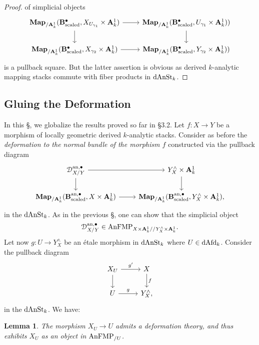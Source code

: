 \documentclass[10pt,a4paper,reqno]{amsart} %
\theoremstyle{plain}
\newtheorem{lem}[thm]{Lemma}
\theoremstyle{definition}
\theoremstyle{remark}
\numberwithin{equation}{section}
\begin{document}
\begin{proof}
    of simplicial objects
        \[
        \begin{tikzcd}
            \bfMap_{/ \bA^1_k}(\mathbf B_\mathrm{scaled}^\bullet,  X_{U_{\gamma_1}} \times \bA^1_k) \ar{r} \ar{d} & \bfMap_{/ \bA^1_k}(\mathbf B_\mathrm{scaled}^\bullet, U_{\gamma_1} \times \bA^1_k) )  \ar{d} \\
            \bfMap_{/ \bA^1_k}(\mathbf B_\mathrm{scaled}^\bullet, X_{{\gamma_2}} \times \bA^1_k) \ar{r} & \bfMap_{/ \bA^1_k}(\mathbf B_\mathrm{scaled}^\bullet, Y_{\gamma_2} \times \bA^1_k) )
        \end{tikzcd}
        \]
    is a pullback square. But the latter assertion is obvious as derived $k$-analytic mapping stacks commute with fiber products in $\mathrm{dAnSt}_k$.
\end{proof}





\subsection{Gluing the Deformation} In this \S, we globalize the results proved so far in \S 3.2.
Let $f \colon X \to Y$ be a morphism of locally geometric derived $k$-analytic stacks.
Consider as before the \emph{deformation to the normal bundle of the morphism $f$} constructed via the pullback diagram
    \[
    \begin{tikzcd}
        \cD^{\mathrm{an}, \bullet}_{X/ Y} \ar{r} \ar{d} & Y^\wedge_X \times \bA^1_k \ar{d} \\
        \bfMap_{/ \bA^1_k} (\bB^{\mathrm{an}, \bullet}_\mathrm{scaled}, X \times \bA^1_k) \ar{r} & \bfMap_{/ \bA^1_k}(\bB^{\mathrm{an},\bullet}_{\mathrm{scaled}}, Y^\wedge_X \times \bA^1_k),
    \end{tikzcd}
    \]
in the \infcat $\mathrm{dAnSt}_k$. As in the previous \S, one can show that the simplicial object 
    \[
        \mathcal D^{\mathrm{an}, \bullet}_{X/ Y} \in \mathrm{AnFMP}_{X \times \mathbf A^1_k/ /Y^\wedge_X \times \mathbf A^1_k}.
    \]
Let now $g \colon U \to Y^\wedge_X$ be an \'etale morphism in $\mathrm{dAnSt}_k$ where $U \in \mathrm{dAfd}_k$. Consider the pullback diagram
    \[
    \begin{tikzcd}
        X_U \ar{r}{g'} \ar{d} & X \ar{d}{f} \\
        U \ar{r}{g} & Y^\wedge_X,
    \end{tikzcd}
    \]
in the \infcat $\mathrm{dAnSt}_k$. We have:

\begin{lem}
    The morphism $X_U \to U$ admits a deformation theory, and thus exhibits $X_U$ as an object in $\mathrm{AnFMP}_{/U}$.
\end{lem}
\end{document}
